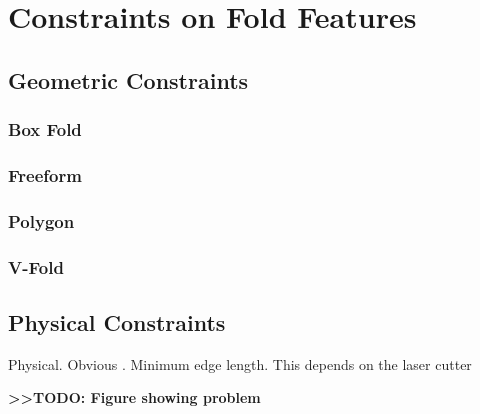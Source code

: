\section{Constraints on Fold
Features}\label{constraints-on-fold-features}

\subsection{Geometric Constraints}\label{geometric-constraints}

\subsubsection{Box Fold}\label{box-fold}

\subsubsection{Freeform}\label{freeform}

\subsubsection{Polygon}\label{polygon}

\subsubsection{V-Fold}\label{v-fold}

\subsection{Physical Constraints}\label{physical-constraints}

Physical. Obvious . Minimum edge length. This depends on the laser
cutter

\textbf{\textgreater{}\textgreater{}TODO: Figure showing problem}
